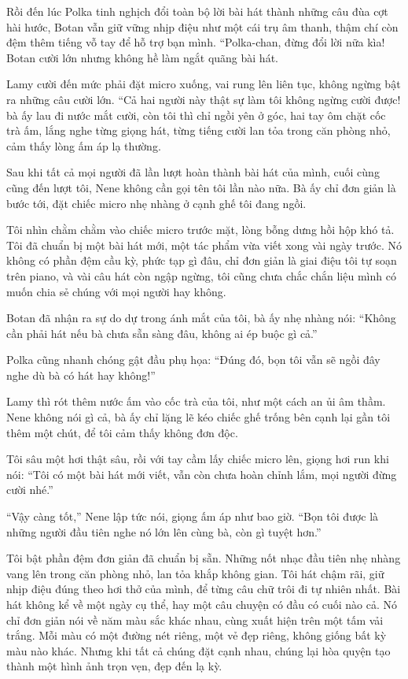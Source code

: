 \documentclass[../main.tex]{subfiles}
\begin{document}
Rồi đến lúc Polka tinh nghịch đổi toàn bộ lời bài hát thành những câu đùa cợt hài hước, Botan vẫn giữ vững nhịp điệu như một cái trụ âm thanh, thậm chí còn đệm thêm tiếng vỗ tay để hỗ trợ bạn mình. ``Polka-chan, đừng đổi lời nữa kìa! Botan cười lớn nhưng không hề làm ngắt quãng bài hát.

Lamy cười đến mức phải đặt micro xuống, vai rung lên liên tục, không ngừng bật ra những câu cười lớn. ``Cả hai người này thật sự làm tôi không ngừng cười được! bà ấy lau đi nước mắt cười, còn tôi thì chỉ ngồi yên ở góc, hai tay ôm chặt cốc trà ấm, lắng nghe từng giọng hát, từng tiếng cười lan tỏa trong căn phòng nhỏ, cảm thấy lòng ấm áp lạ thường.

\ct

Sau khi tất cả mọi người đã lần lượt hoàn thành bài hát của mình, cuối cùng cũng đến lượt tôi, Nene không cần gọi tên tôi lần nào nữa. Bà ấy chỉ đơn giản là bước tới, đặt chiếc micro nhẹ nhàng ở cạnh ghế tôi đang ngồi.

Tôi nhìn chằm chằm vào chiếc micro trước mặt, lòng bỗng dưng hồi hộp khó tả. Tôi đã chuẩn bị một bài hát mới, một tác phẩm vừa viết xong vài ngày trước. Nó không có phần đệm cầu kỳ, phức tạp gì đâu, chỉ đơn giản là giai điệu tôi tự soạn trên piano, và vài câu hát còn ngập ngừng, tôi cũng chưa chắc chắn liệu mình có muốn chia sẻ chúng với mọi người hay không.

Botan đã nhận ra sự do dự trong ánh mắt của tôi, bà ấy nhẹ nhàng nói: ``Không cần phải hát nếu bà chưa sẵn sàng đâu, không ai ép buộc gì cả.''

Polka cũng nhanh chóng gật đầu phụ họa: ``Đúng đó, bọn tôi vẫn sẽ ngồi đây nghe dù bà có hát hay không!''

Lamy thì rót thêm nước ấm vào cốc trà của tôi, như một cách an ủi âm thầm. Nene không nói gì cả, bà ấy chỉ lặng lẽ kéo chiếc ghế trống bên cạnh lại gần tôi thêm một chút, để tôi cảm thấy không đơn độc.

Tôi sâu một hơi thật sâu, rồi với tay cầm lấy chiếc micro lên, giọng hơi run khi nói: ``Tôi có một bài hát mới viết, vẫn còn chưa hoàn chỉnh lắm, mọi người đừng cười nhé.''

``Vậy càng tốt,'' Nene lập tức nói, giọng ấm áp như bao giờ. ``Bọn tôi được là những người đầu tiên nghe nó lớn lên cùng bà, còn gì tuyệt hơn.''

Tôi bật phần đệm đơn giản đã chuẩn bị sẵn. Những nốt nhạc đầu tiên nhẹ nhàng vang lên trong căn phòng nhỏ, lan tỏa khắp không gian. Tôi hát chậm rãi, giữ nhịp điệu đúng theo hơi thở của mình, để từng câu chữ trôi đi tự nhiên nhất. Bài hát không kể về một ngày cụ thể, hay một câu chuyện có đầu có cuối nào cả. Nó chỉ đơn giản nói về năm màu sắc khác nhau, cùng xuất hiện trên một tấm vải trắng. Mỗi màu có một đường nét riêng, một vẻ đẹp riêng, không giống bất kỳ màu nào khác. Nhưng khi tất cả chúng đặt cạnh nhau, chúng lại hòa quyện tạo thành một hình ảnh trọn vẹn, đẹp đến lạ kỳ.
\end{document}
